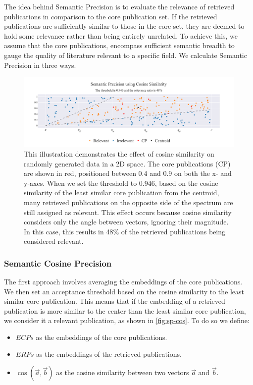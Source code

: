 The idea behind Semantic Precision is to evaluate the relevance of retrieved publications in comparison to the core publication set. If the retrieved publications are sufficiently similar to those in the core set, they are deemed to hold some relevance rather than being entirely unrelated. To achieve this, we assume that the core publications, encompass sufficient semantic breadth to gauge the quality of literature relevant to a specific field. We calculate Semantic Precision in three ways.

\begin{figure}[]
	\centering	
	\includegraphics[scale=0.4]{pics/sp_cos.pdf}
	\caption[Semantic Precision using Cosine Similarity]{This illustration demonstrates the effect of cosine similarity on randomly generated data in a 2D space. The core publications (CP) are shown in red, positioned between 0.4 and 0.9 on both the x- and y-axes. When we set the threshold to 0.946, based on the cosine similarity of the least similar core publication from the centroid, many retrieved publications on the opposite side of the spectrum are still assigned as relevant. This effect occurs because cosine similarity considers only the angle between vectors, ignoring their magnitude. In this case, this results in 48\% of the retrieved publications being considered relevant.}

	\label{fig:sp-cos}
\end{figure}

\subsubsection{Semantic Cosine Precision}

The first approach involves averaging the embeddings of the core publications. We then set an acceptance threshold based on the cosine similarity to the least similar core publication. This means that if the embedding of a retrieved publication is more similar to the center than the least similar core publication, we consider it a relevant publication, as shown in \autoref{fig:sp-cos}. To do so we define:
\begin{itemize}
	\item $ECPs$ as the embeddings of the core publications.
	\item $ERPs$ as the embeddings of the retrieved publications.
	\item $\cos(\vec{a}, \vec{b})$ as the cosine similarity between two vectors $\vec{a}$ and $\vec{b}$.
\end{itemize}

